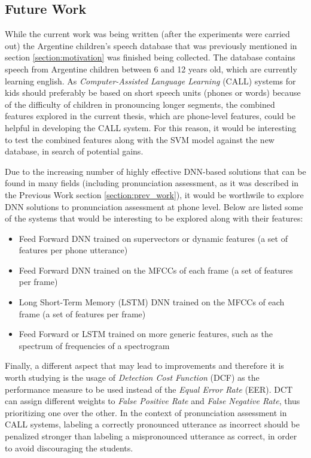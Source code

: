 \color{red}
\subsection{Future Work}

While the current work was being written (after the experiments were carried out)
the Argentine children's speech database that was previously mentioned in section
\ref{section:motivation} was finished being collected. The database contains speech
from Argentine children between 6 and 12 years old, which are currently learning
english. As \textit{Computer-Assisted Language Learning} (CALL) systems
for kids should preferably be based on short speech units (phones or words) because
of the difficulty of children in pronouncing longer segments, the combined features
explored in the current thesis, which are phone-level features, could be helpful
in developing the CALL system. For this reason, it would be interesting to test
the combined features along with the SVM model against the new database, in search
of potential gains.

Due to the increasing number of highly effective DNN-based solutions that can be found in
many fields (including pronunciation assessment,
as it was described in the Previous Work section \ref{section:prev_work}),
it would be worthwile to explore DNN solutions to pronunciation assessment
at phone level. Below are listed some of the systems that would be interesting to be explored
along with their features:

\begin{itemize}
  \item Feed Forward DNN trained on supervectors or dynamic features (a set of features per phone utterance)
  \item Feed Forward DNN trained on the MFCCs of each frame (a set of features per frame)
  \item Long Short-Term Memory (LSTM) DNN trained on the MFCCs of each frame (a set of features per frame)
  \item Feed Forward or LSTM trained on more generic features, such as the spectrum of frequencies of a spectrogram
\end{itemize}

Finally, a different aspect that may lead to improvements and therefore it is worth studying
is the usage of \textit{Detection Cost Function} (DCF) as the performance measure
to be used instead of the \textit{Equal Error Rate} (EER). DCT can assign different
weights to \textit{False Positive Rate} and \textit{False Negative Rate}, thus
prioritizing one over the other. In the context of pronunciation assessment in
CALL systems, labeling a correctly pronounced utterance as incorrect should be
penalized stronger than labeling a mispronounced utterance as correct, in order
to avoid discouraging the students.

\color{black}
